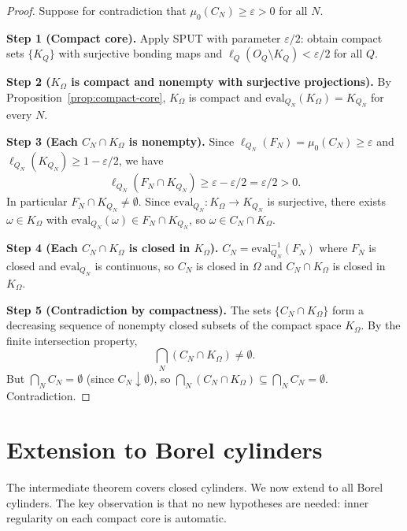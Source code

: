 \begin{proof}
Suppose for contradiction that $\mu_0(C_N) \geq \varepsilon > 0$
for all $N$.

\textbf{Step 1 (Compact core).}
Apply SPUT with parameter $\varepsilon/2$: obtain compact sets
$\{K_Q\}$ with surjective bonding maps and $\ell_Q(O_Q \setminus
K_Q) < \varepsilon/2$ for all $Q$.

\textbf{Step 2 ($K_\Omega$ is compact and nonempty with surjective
projections).}
By Proposition~\ref{prop:compact-core}, $K_\Omega$ is compact and
$\mathrm{eval}_{Q_N}(K_\Omega) = K_{Q_N}$ for every $N$.

\textbf{Step 3 (Each $C_N \cap K_\Omega$ is nonempty).}
Since $\ell_{Q_N}(F_N) = \mu_0(C_N) \geq \varepsilon$ and
$\ell_{Q_N}(K_{Q_N}) \geq 1 - \varepsilon/2$, we have
\[
\ell_{Q_N}(F_N \cap K_{Q_N})
\geq
\varepsilon - \varepsilon/2 = \varepsilon/2 > 0.
\]
In particular $F_N \cap K_{Q_N} \neq \emptyset$.  Since
$\mathrm{eval}_{Q_N} : K_\Omega \to K_{Q_N}$ is surjective, there
exists $\omega \in K_\Omega$ with $\mathrm{eval}_{Q_N}(\omega) \in
F_N \cap K_{Q_N}$, so $\omega \in C_N \cap K_\Omega$.

\textbf{Step 4 (Each $C_N \cap K_\Omega$ is closed in $K_\Omega$).}
$C_N = \mathrm{eval}_{Q_N}^{-1}(F_N)$ where $F_N$ is closed and
$\mathrm{eval}_{Q_N}$ is continuous, so $C_N$ is closed in $\Omega$
and $C_N \cap K_\Omega$ is closed in $K_\Omega$.

\textbf{Step 5 (Contradiction by compactness).}
The sets $\{C_N \cap K_\Omega\}$ form a decreasing sequence of
nonempty closed subsets of the compact space $K_\Omega$.  By the
finite intersection property,
\[
\bigcap_N (C_N \cap K_\Omega) \neq \emptyset.
\]
But $\bigcap_N C_N = \emptyset$ (since $C_N \downarrow \emptyset$),
so $\bigcap_N (C_N \cap K_\Omega) \subseteq \bigcap_N C_N =
\emptyset$.  Contradiction.
\end{proof}

\section{Extension to Borel cylinders}\label{sec:borel}

The intermediate theorem covers closed cylinders.  We now extend to
all Borel cylinders.  The key observation is that no new hypotheses
are needed: inner regularity on each compact core is automatic.

